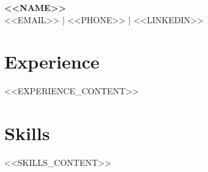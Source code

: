 \documentclass[11pt,a4paper]{article}
\begin{document}
\begin{center}
    {\Huge \textbf{<<NAME>>}} \\ \vspace{2mm}
    <<EMAIL>> | <<PHONE>> | <<LINKEDIN>>
\end{center}

\vspace{5mm}

\section{Experience}
<<EXPERIENCE_CONTENT>>

\section{Skills}
<<SKILLS_CONTENT>>
\end{document}
